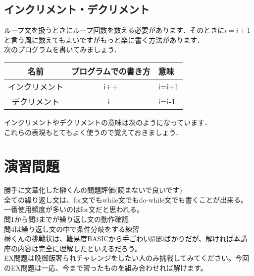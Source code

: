 \documentclass[a4j,titlepage,dvipdfmx]{jsarticle}   %
\newcommand{\codepath}{./code}
\newcommand{\articlepath}{./article}
\begin{document}
\subsection{インクリメント・デクリメント}
ループ文を扱うときにループ回数を数える必要があります．そのときに$i=i+1$と言う風に数えてもよいですがもっと楽に書く方法があります．\\
次のプログラムを書いてみましょう．\\

\begin{table}[htb]
\begin{tabular}{|c|c|l|}
\hline
名前      & \multicolumn{1}{l|}{プログラムでの書き方} & 意味    \\ \hline
インクリメント & i++                             & i=i+1 \\ \hline
デクリメント  & i--                             & i=i-1 \\ \hline
\end{tabular}
\end{table}
インクリメントやデクリメントの意味は次のようになっています．\\
これらの表現もとてもよく使うので覚えておきましょう．\\



\section{演習問題}
勝手に文章化した榊くんの問題評価(読まないで良いです)\\
全ての繰り返し文は、for文でもwhile文でもdo-while文でも書くことが出来る。\\
一番使用頻度が多いのはfor文だと思われる。\\
問1から問3までが繰り返し文の動作確認\\
問4は繰り返し文の中で条件分岐をする練習\\
榊くんの挑戦状は、難易度BASICから手ごわい問題ばかりだが、解ければ本講座の内容は完全に理解したといえるだろう。\\
EX問題は晩御飯奢られチャレンジをしたい人のみ挑戦してみてください。今回のEX問題は一応、今まで習ったものを組み合わせれば解けます。\\
\end{document}
